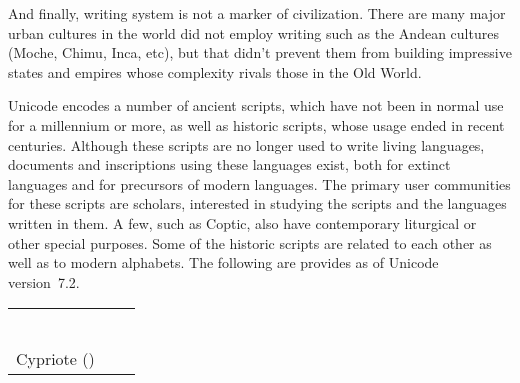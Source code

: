 And finally, writing system is not a marker of civilization. There are many major urban cultures in the world did not employ writing such as the Andean cultures (Moche, Chimu, Inca, etc), but that didn't prevent them from building impressive states and empires whose complexity rivals those in the Old World.

Unicode encodes a number of ancient scripts, which have not been in normal use for a millennium or more, as well as historic scripts, whose usage ended in recent centuries. Although these scripts are no longer used to write living languages, documents and inscriptions using these languages exist, both for extinct languages and for precursors of modern languages. The primary user communities for these scripts are scholars, interested in studying the scripts and the languages written in them. A few, such as Coptic, also have contemporary liturgical or other special purposes. Some of the historic scripts are related to each other as well as to modern alphabets. The following are provides as of Unicode version~7.2.
\begin{center}
\begin{tabular}{lll}
\nameref{s:ogham}           
&\nameref{s:anatolian}
&\nameref{s:avestan}\\

\nameref{s:olditalic}      
&\nameref{s:oldsoutharabian}          
&\nameref{s:ugaritic} \\

    \nameref{s:runic}
&\nameref{s:phoenician} 
&\nameref{s:oldpersian} \\
    \nameref{s:gothic}            
    
&\nameref{s:imperialaramaic}            
&\nameref{s:sumero} \\

    \nameref{s:oldturkic}   
& \nameref{s:mandaic} 
& \nameref{ch:hieroglyphics}\\

 \nameref{s:linearb} 
&\nameref{s:parthian}       
&\nameref{s:meroitic}\\

 Cypriote (\pageref{s:cypriot})
&\nameref{s:inscriptionalpahlavi}       
& \nameref{s:lineara}\\
\end{tabular}
\end{center}

